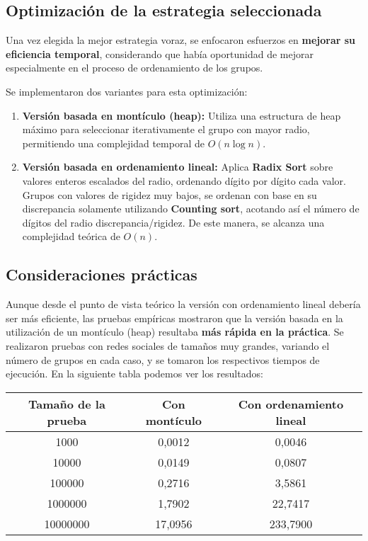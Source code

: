 \subsection{Optimización de la estrategia seleccionada}

Una vez elegida la mejor estrategia voraz, se enfocaron esfuerzos en \textbf{mejorar su eficiencia temporal}, considerando que había oportunidad de mejorar especialmente en el proceso de ordenamiento de los grupos.

Se implementaron dos variantes para esta optimización:

\begin{enumerate}
	\item \textbf{Versión basada en montículo (heap):} Utiliza una estructura de heap máximo para seleccionar iterativamente el grupo con mayor radio, permitiendo una complejidad temporal de $O(n \log n)$.

	\item \textbf{Versión basada en ordenamiento lineal:} Aplica \textbf{Radix Sort} sobre valores enteros escalados del radio, ordenando dígito por dígito cada valor. Grupos con valores de rigidez muy bajos, se ordenan con base en su discrepancia solamente utilizando \textbf{Counting sort}, acotando así el número de dígitos del radio discrepancia/rigidez. De este manera, se alcanza una complejidad teórica de $O(n)$.
\end{enumerate}

\subsection{Consideraciones prácticas}

Aunque desde el punto de vista teórico la versión con ordenamiento lineal debería ser más eficiente, las pruebas empíricas mostraron que la versión basada en la utilización de un montículo (heap) resultaba \textbf{más rápida en la práctica}. Se realizaron pruebas con redes sociales de tamaños muy grandes, variando el número de grupos en cada caso, y se tomaron los respectivos tiempos de ejecución. En la siguiente tabla podemos ver los resultados:

\begin{table}[h]
	\centering
	\begin{tabular}{|c|c|c|}
		\hline
		\textbf{Tamaño de la prueba} & \textbf{Con montículo} & \textbf{Con ordenamiento lineal} \\ \hline
		1000     & 0,0012  & 0,0046 \\ \hline
		10000    & 0,0149  & 0,0807 \\ \hline
		100000   & 0,2716  & 3,5861 \\ \hline
		1000000  & 1,7902  & 22,7417 \\ \hline
		10000000 & 17,0956 & 233,7900 \\ \hline
	\end{tabular}
\end{table}

